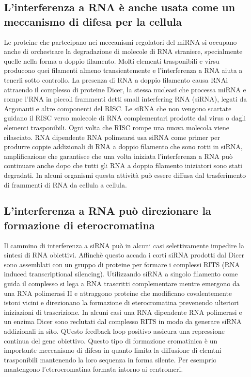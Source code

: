 \subsection{L'interferenza a RNA \`e anche usata come un meccanismo di difesa per la cellula}
Le proteine che partecipano nei meccanismi regolatori del miRNA si occupano anche di orchestrare la degradazione di molecole di RNA straniere, specialmente quelle nella forma a doppio
filamento. Molti elementi trasponibili e virsu producono quei filamenti almeno transientemente e l'interferenza a RNA aiuta a tenerli sotto controllo. La presenza di RNA a doppio 
filamento causa RNAi attraendo il complesso di proteine Dicer, la stessa nucleasi che processa miRNA e rompe l'RNA in piccoli frammenti  detti small interfering RNA (siRNA), legati da
Argonauti e altre componenti del RISC. Le siRNA che non vengono scartate guidano il RISC verso molecole di RNA complementari prodotte dal virus o dagli elementi trasponibili. Ogni volta
che RISC rompe una nuova molecola viene rilasciato. RNA dipendente RNA polimearsi usa siRNA come primer per produrre coppie addizionali di RNA a doppio filamento che sono rotti in 
siRNA, amplificazione che garantisce che una volta iniziata l'interferenza a RNA pu\`o continuare anche dopo che tutti gli RNA a doppio filamento iniziatori sono stati degradati. In
alcuni organismi questa attivit\`a pu\`o essere diffusa dal trasferimento di frammenti di RNA da cellula a cellula. 
\subsection{L'interferenza a RNA pu\`o direzionare la formazione di eterocromatina}
Il cammino di interferenza a siRNA pu\`o in alcuni casi selettivamente impedire la sintesi di RNA obiettivi. Affinch\`e questo accada i corti siRNA prodotti dal Dicer sono assemblati 
con un gruppo di proteine per formare i complessi RITS (RNA induced transcriptional silencing). Utilizzando siRNA a singolo filamento come guida il complesso si lega a RNA trascritti
complementare mentre emergono da una RNA polimerasi II e attraggono proteine che modificano covalentemente istoni vicini e direzionano la formazione di eterocromatina prevenendo 
ulteriori iniziazioni di trascrizione. In alcuni casi una RNA dipendente RNA polimerasi e un enzima Dicer sono reclutati dal complesso RITS in modo da generare siRNA addizionali in sito.
QUesto feedback loop positivo assicura una repressione continua del gene obiettivo. Questo tipo di formazione cromatinica \`e un importante meccanismo di difesa in quanto limita la
diffusione di elemtni trasponibili mantenendo la loro sequenza in forma silente. Per esemprio mantengono l'eterocromatina formata intorno ai centromeri. 
